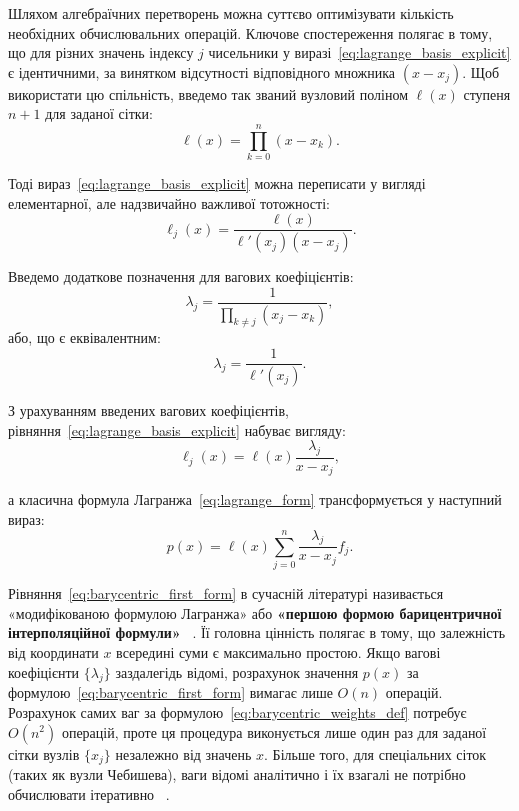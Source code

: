 Шляхом алгебраїчних перетворень можна суттєво оптимізувати кількість необхідних обчислювальних операцій. Ключове спостереження полягає в тому, що для різних значень індексу $j$ чисельники у виразі~\eqref{eq:lagrange_basis_explicit} є ідентичними, за винятком відсутності відповідного множника $(x - x_j)$. Щоб використати цю спільність, введемо так званий вузловий поліном $\ell(x)$ ступеня $n+1$ для заданої сітки:
\begin{equation}\label{eq:nodal_polynomial}
	\ell(x) = \prod_{k=0}^{n} (x - x_k).
\end{equation}

Тоді вираз~\eqref{eq:lagrange_basis_explicit} можна переписати у вигляді елементарної, але надзвичайно важливої тотожності:
\begin{equation}\label{eq:lagrange_identity}
	\ell_j(x) = \frac{\ell(x)}{\ell'(x_j)(x - x_j)}.
\end{equation}

Введемо додаткове позначення для вагових коефіцієнтів:
\begin{equation}\label{eq:barycentric_weights_def}
	\lambda_j = \frac{1}{\prod_{k \neq j} (x_j - x_k)},
\end{equation}
або, що є еквівалентним:
\begin{equation}\label{eq:barycentric_weights_derivative}
	\lambda_j = \frac{1}{\ell'(x_j)}.
\end{equation}

З урахуванням введених вагових коефіцієнтів, рівняння~\eqref{eq:lagrange_basis_explicit} набуває вигляду:
\begin{equation}\label{eq:lagrange_basis_barycentric}
	\ell_j(x) = \ell(x) \frac{\lambda_j}{x - x_j},
\end{equation}

а класична формула Лагранжа~\eqref{eq:lagrange_form} трансформується у наступний вираз:
\begin{equation}\label{eq:barycentric_first_form}
	p(x) = \ell(x) \sum_{j=0}^{n} \frac{\lambda_j}{x - x_j} f_j.
\end{equation}

Рівняння~\eqref{eq:barycentric_first_form} в сучасній літературі називається «модифікованою формулою Лагранжа» або \textbf{«першою формою барицентричної інтерполяційної формули»} ~\cite{trefethen2013approximation}. Її головна цінність полягає в тому, що залежність від координати $x$ всередині суми є максимально простою. Якщо вагові коефіцієнти $\{\lambda_j\}$ заздалегідь відомі, розрахунок значення $p(x)$ за формулою~\eqref{eq:barycentric_first_form} вимагає лише $O(n)$ операцій. Розрахунок самих ваг за формулою~\eqref{eq:barycentric_weights_def} потребує $O(n^2)$ операцій, проте ця процедура виконується лише один раз для заданої сітки вузлів $\{x_j\}$ незалежно від значень $x$. Більше того, для спеціальних сіток (таких як вузли Чебишева), ваги відомі аналітично і їх взагалі не потрібно обчислювати ітеративно ~\cite{trefethen2013approximation}.

